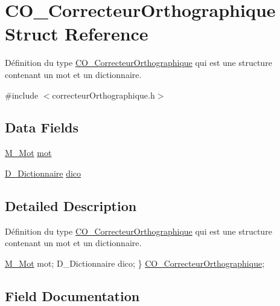 \hypertarget{struct_c_o___correcteur_orthographique}{}\section{C\+O\+\_\+\+Correcteur\+Orthographique Struct Reference}
\label{struct_c_o___correcteur_orthographique}


Définition du type \hyperlink{struct_c_o___correcteur_orthographique}{C\+O\+\_\+\+Correcteur\+Orthographique} qui est une structure contenant un mot et un dictionnaire.  




{\ttfamily \#include $<$correcteur\+Orthographique.\+h$>$}

\subsection*{Data Fields}
\begin{DoxyCompactItemize}
\item 
\hyperlink{struct_m___mot}{M\+\_\+\+Mot} \hyperlink{struct_c_o___correcteur_orthographique_a59e1713ada33a83d507559ed27417d7a}{mot}
\item 
\hyperlink{dictionnaire_8h_a8f36a2958b6861fc34918440f72d4350}{D\+\_\+\+Dictionnaire} \hyperlink{struct_c_o___correcteur_orthographique_a1e4bcaaa8727be0aad917f306a1ed4ad}{dico}
\end{DoxyCompactItemize}


\subsection{Detailed Description}
Définition du type \hyperlink{struct_c_o___correcteur_orthographique}{C\+O\+\_\+\+Correcteur\+Orthographique} qui est une structure contenant un mot et un dictionnaire. 

\hyperlink{struct_m___mot}{M\+\_\+\+Mot} mot; D\+\_\+\+Dictionnaire dico; \} \hyperlink{struct_c_o___correcteur_orthographique}{C\+O\+\_\+\+Correcteur\+Orthographique}; 

\subsection{Field Documentation}
\mbox{\label{struct_c_o___correcteur_orthographique_a1e4bcaaa8727be0aad917f306a1ed4ad}} 
